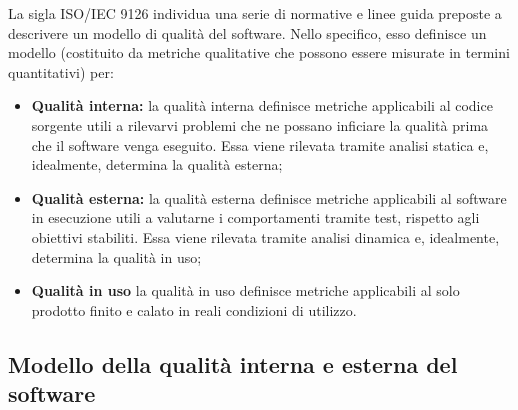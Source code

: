 \documentclass[openany,12pt,a4paper]{report}
\begin{document}
La sigla ISO/IEC 9126 individua una serie di normative e linee guida preposte a descrivere un modello di qualità del software. Nello specifico, esso definisce un modello (costituito da metriche qualitative che possono essere misurate in termini quantitativi) per:

\begin{itemize}
    \item \textbf{Qualità interna:} la qualità interna definisce metriche applicabili al codice sorgente utili a rilevarvi problemi che ne possano inficiare la qualità prima che il software venga eseguito. Essa viene rilevata tramite analisi statica e, idealmente, determina la qualità esterna;
    
    \item \textbf{Qualità esterna:} la qualità esterna definisce metriche applicabili al software in esecuzione utili a valutarne i comportamenti tramite test, rispetto agli obiettivi stabiliti. Essa viene rilevata tramite analisi dinamica e, idealmente, determina la qualità in uso;
    
    \item \textbf{Qualità in uso} la qualità in uso definisce metriche applicabili al solo prodotto finito e calato in reali condizioni di utilizzo.
\end{itemize}

\subsection{Modello della qualità interna e esterna del software}
\end{document}
